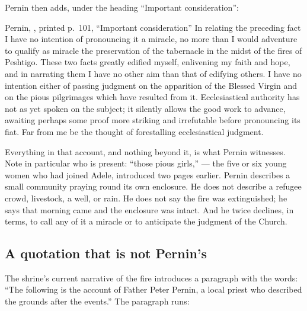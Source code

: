 Pernin then adds, under the heading ``Important consideration'':

\begin{witnesstext}{Pernin, , printed
p.~101, ``Important consideration''}
In relating the preceding fact I have no intention of pronouncing it a
miracle, no more than I would adventure to qualify as miracle the
preservation of the tabernacle in the midst of the fires of Peshtigo.
These two facts greatly edified myself, enlivening my faith and hope,
and in narrating them I have no other aim than that of edifying others.
I have no intention either of passing judgment on the apparition of the
Blessed Virgin and on the pious pilgrimages which have resulted from
it. Ecclesiastical authority has not as yet spoken on the subject; it
silently allows the good work to advance, awaiting perhaps some proof
more striking and irrefutable before pronouncing its fiat. Far from me
be the thought of forestalling ecclesiastical judgment.
\end{witnesstext}

Everything in that account, and nothing beyond it, is what Pernin
witnesses. Note in particular who is present: ``those pious girls,''
 --- the five or six young women who had
joined Adele, introduced two pages earlier. Pernin describes a small
community praying round its own enclosure. He does not describe a
refugee crowd, livestock, a well, or rain. He does not say the fire was
extinguished; he says that morning came and the enclosure was intact.
And he twice declines, in terms, to call any of it a miracle or to
anticipate the judgment of the Church.

\subsection{A quotation that is not Pernin's}

The shrine's current narrative of the fire introduces a paragraph with
the words: ``The following is the account of Father Peter Pernin, a
local priest who described the grounds after the events.'' The
paragraph runs:

